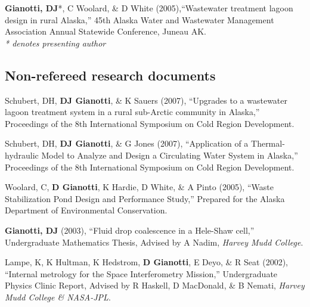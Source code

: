 \documentclass[10pt, a4paper]{article}
\renewcommand{\emph}[1]{\textit{#1}}
\newcommand{\lbr}{\vspace*{4pt}}
\newcommand{\years}[1]{\marginnote{\scriptsize #1}}
\begin{document}
\years{2005}\textbf{Gianotti, DJ}*, C Woolard, \& D White (2005),``Wastewater treatment lagoon design in rural Alaska,'' 45th Alaska Water and Wastewater Management Association Annual Statewide Conference, Juneau AK.\lbr
\\ \emph{* denotes presenting author}

\subsection*{Non-refereed research documents}
\noindent
\years{2007}Schubert, DH, \textbf{DJ Gianotti}, \& K Sauers (2007), ``Upgrades to a  wastewater lagoon treatment system in a rural sub-Arctic community in Alaska,'' Proceedings of the 8th International Symposium on Cold Region Development.\lbr

\years{2007}Schubert, DH, \textbf{DJ Gianotti}, \& G Jones (2007), ``Application of a Thermal-hydraulic Model to Analyze and Design a Circulating Water System in Alaska,'' Proceedings of the 8th International Symposium on Cold Region Development.\lbr

\years{2005}Woolard, C, \textbf{D Gianotti}, K Hardie, D White, \& A Pinto (2005), ``Waste Stabilization Pond Design and Performance Study,'' Prepared for the Alaska Department of Environmental Conservation.\lbr

\years{2003}\textbf{Gianotti, DJ} (2003), ``Fluid drop coalescence in a Hele-Shaw cell,'' Undergraduate Mathematics Thesis, Advised by A Nadim, \emph{Harvey Mudd College}.\lbr

\years{2002}Lampe, K, K Hultman, K Hedstrom, \textbf{D Gianotti}, E Deyo, \& R Seat (2002), ``Internal metrology for the Space Interferometry Mission,'' Undergraduate Physics Clinic Report, Advised by R Haskell, D MacDonald, \& B Nemati, \emph{Harvey Mudd College \& NASA-JPL}.

%
\end{document}
